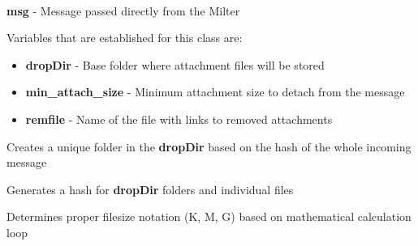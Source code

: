 \documentclass[letterpaper,10pt,english]{sphinxmanual}
\begin{document}
\begin{fulllineitems}
\label{codedocs/EARSmilter:EARSmilter.EARSmilter.FileSys}~

\begin{fulllineitems}
\label{codedocs/EARSmilter:EARSmilter.EARSmilter.FileSys.__init__}
\textbf{msg} - Message passed directly from the Milter

Variables that are established for this class are:
\begin{itemize}
\item {} 
\textbf{dropDir} - Base folder where attachment files will be stored

\item {} 
\textbf{min\_attach\_size} - Minimum attachment size to detach from the message

\item {} 
\textbf{remfile} - Name of the file with links to removed attachments

\end{itemize}

\end{fulllineitems}


\begin{fulllineitems}
\label{codedocs/EARSmilter:EARSmilter.EARSmilter.FileSys.Dir}
Creates a unique folder in the \textbf{dropDir} based on the hash of the whole incoming message

\end{fulllineitems}


\begin{fulllineitems}
\label{codedocs/EARSmilter:EARSmilter.EARSmilter.FileSys.hashit}
Generates a hash for \textbf{dropDir} folders and individual files

\end{fulllineitems}


\begin{fulllineitems}
\label{codedocs/EARSmilter:EARSmilter.EARSmilter.FileSys.filesize_notation}
Determines proper filesize notation (K, M, G) based on mathematical calculation loop


\end{fulllineitems}
\end{fulllineitems}
\end{document}
